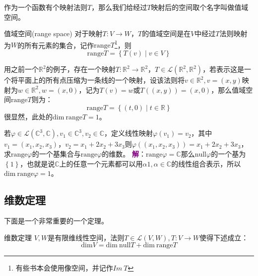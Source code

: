 作为一个函数有个映射法则$T$，那么我们给经过$T$映射后的空间取个名字叫做值域空间。

\begin{definition}{值域空间(range space)}
	对于映射$T:V\rightarrow W$，$T$的值域空间是在$V$中经过$T$法则映射为$W$的所有元素的集合，记作$\text{range}T$\footnote{有些书本会使用像空间，并记作$Im~T$}，则
	$$
	\text{range}T=\left\{ T(v)\mid v\in V \right\}
	$$
\end{definition}

用之前一个$\mathbb{R}^2$的例子，存在一个映射$T: \mathbb{R}^2\rightarrow \mathbb{R}^2$，$T\in \mathcal{L}(\mathbb{R}^2,\mathbb{R}^2)$，若表示这是一个将平面上的所有点压缩为一条线的一个映射，设该法则将$v\in \mathbb{R}^2,v=(x,y)$映射为$w\in \mathbb{R}^2,w=(x,0)$，记为$T(v)=w$或$T((x,y))=(x,0)$，那么值域空间$\text{range}T$则为：
$$
\text{range}T=\left\{ (t,0)\mid t\in \mathbb{R} \right\}
$$
很显然，此处的$\text{dim}~\text{range}T=1$。
\begin{example}
	若$\varphi \in \mathcal{L}(\mathbb{C}^3,\mathbb{C}),v_1\in \mathbb{C}^3,v_2\in \mathbb{C}$，定义线性映射$\varphi(v_1)=v_2$，其中$v_1=(x_1,x_2,x_3)$，$v_2=x_1+2x_2+3x_3$则$\varphi((x_1,x_2,x_3))=x_1+2x_2+3x_3$，求$\text{range}\varphi$的一个基集合与$\text{range}\varphi$的维数。
	\tcblower
	\textcolor{purple}{\textbf{解}}：$\text{range}\varphi=\mathbb{C}$那么$\text{null}\varphi$的一个基为$\left\{ 1 \right\}$，也就是说$\mathbb{C}$上的任意一个元素都可以用$\alpha 1,\alpha\in \mathbb{C}$的线性组合表示，所以$\text{dim}~\text{range}\varphi =1$。
\end{example}

\subsection{维数定理}

下面是一个非常重要的一个定理。

\begin{theorem}{维数定理}
	\label{the:important}
	$V,W$是有限维线性空间，法则$T\in\mathcal{L}(V,W),T:V\rightarrow W$使得下述成立：$$\text{dim}V=\text{dim}~\text{null}T+\text{dim}~\text{range}T$$
\end{theorem}


